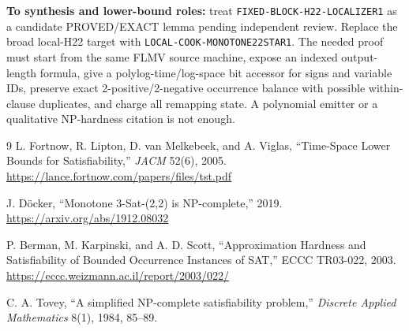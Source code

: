 \documentclass[11pt]{article}
\begin{document}
\textbf{To synthesis and lower-bound roles:} treat
\texttt{FIXED-BLOCK-H22-LOCALIZER1} as a candidate PROVED/EXACT lemma pending
independent review.  Replace the broad local-H22 target with
\texttt{LOCAL-COOK-MONOTONE22STAR1}.  The needed proof must start from the
same FLMV source machine, expose an indexed output-length formula, give a
polylog-time/log-space bit accessor for signs and variable IDs, preserve
exact 2-positive/2-negative occurrence balance with possible within-clause
duplicates, and charge all remapping state.  A polynomial emitter or a
qualitative NP-hardness citation is not enough.

\begin{thebibliography}{9}
L. Fortnow, R. Lipton, D. van Melkebeek, and A. Viglas,
``Time-Space Lower Bounds for Satisfiability,'' \emph{JACM} 52(6), 2005.
\url{https://lance.fortnow.com/papers/files/tst.pdf}

J. D\"ocker, ``Monotone 3-Sat-(2,2) is NP-complete,'' 2019.
\url{https://arxiv.org/abs/1912.08032}

P. Berman, M. Karpinski, and A. D. Scott,
``Approximation Hardness and Satisfiability of Bounded Occurrence Instances
of SAT,'' ECCC TR03-022, 2003.
\url{https://eccc.weizmann.ac.il/report/2003/022/}

C. A. Tovey, ``A simplified NP-complete satisfiability problem,''
\emph{Discrete Applied Mathematics} 8(1), 1984, 85--89.
\end{thebibliography}

\end{document}

